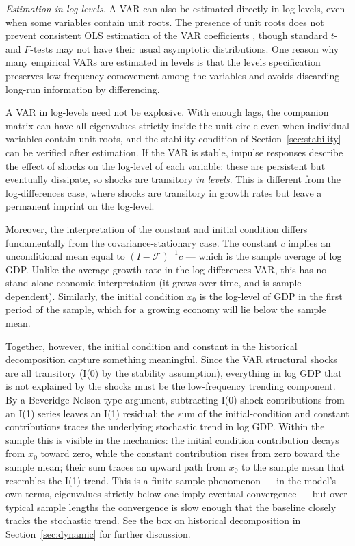 \documentclass[12pt]{article}
\begin{document}
\begin{notebox}
\noindent\textit{Estimation in log-levels.} A VAR can also be estimated directly in log-levels, even when some variables contain unit roots. The presence of unit roots does not prevent consistent OLS estimation of the VAR coefficients \citep{SimsStockWatson1990}, though standard $t$- and $F$-tests may not have their usual asymptotic distributions. One reason why many empirical VARs are estimated in levels is that the levels specification preserves low-frequency comovement among the variables and avoids discarding long-run information by differencing.

A VAR in log-levels need not be explosive. With enough lags, the companion matrix can have all eigenvalues strictly inside the unit circle even when individual variables contain unit roots, and the stability condition of Section~\ref{sec:stability} can be verified after estimation. If the VAR is stable, impulse responses describe the effect of shocks on the log-level of each variable: these are persistent but eventually dissipate, so shocks are transitory \textit{in levels}. This is different from the log-differences case, where shocks are transitory in growth rates but leave a permanent imprint on the log-level.

Moreover, the interpretation of the constant and initial condition differs fundamentally from the covariance-stationary case. The constant $c$ implies an unconditional mean equal to $(I - \mathcal{F})^{-1}c$ --- which is the sample average of log GDP. Unlike the average growth rate in the log-differences VAR, this has no stand-alone economic interpretation (it grows over time, and is sample dependent). Similarly, the initial condition $x_0$ is the log-level of GDP in the first period of the sample, which for a growing economy will lie below the sample mean.

Together, however, the initial condition and constant in the historical decomposition capture something meaningful. Since the VAR structural shocks are all transitory (I(0) by the stability assumption), everything in log GDP that is not explained by the shocks must be the low-frequency trending component. By a Beveridge-Nelson-type argument, subtracting I(0) shock contributions from an I(1) series leaves an I(1) residual: the sum of the initial-condition and constant contributions traces the underlying stochastic trend in log GDP. Within the sample this is visible in the mechanics: the initial condition contribution decays from $x_0$ toward zero, while the constant contribution rises from zero toward the sample mean; their sum traces an upward path from $x_0$ to the sample mean that resembles the I(1) trend. This is a finite-sample phenomenon --- in the model's own terms, eigenvalues strictly below one imply eventual convergence --- but over typical sample lengths the convergence is slow enough that the baseline closely tracks the stochastic trend. See the box on historical decomposition in Section~\ref{sec:dynamic} for further discussion.


\end{notebox}
\end{document}
